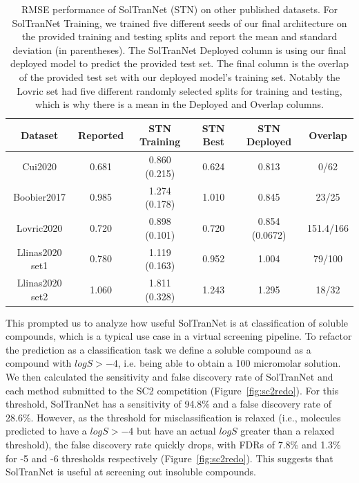 \documentclass[journal=jmcmar,manuscript=article]{achemso}
\begin{document}
\begin{table}
    \centering
    \begin{tabular}{|c|c|c|c|c|c|}
        \hline
        Dataset &  Reported & STN Training &  STN Best & STN Deployed & Overlap \\
        \hline
        Cui2020 & 0.681 & 0.860 (0.215) & 0.624 & 0.813 & 0/62 \\
        Boobier2017 & 0.985 & 1.274 (0.178) & 1.010 & 0.845 & 23/25 \\
        Lovric2020 & 0.720 & 0.898 (0.101) & 0.720 & 0.854 (0.0672) & 151.4/166 \\
        Llinas2020 set1 & 0.780 & 1.119 (0.163) & 0.952 & 1.004 & 79/100 \\
        Llinas2020 set2 & 1.060 & 1.811 (0.328) & 1.243 & 1.295 & 18/32 \\
        \hline
    \end{tabular}
    \caption{RMSE performance of SolTranNet (STN) on other published datasets. For SolTranNet Training, we trained five different seeds of our final architecture on the provided training and testing splits and report the mean and standard deviation (in parentheses). The SolTranNet Deployed column is using our final deployed model to predict the provided test set. The final column is the overlap of the provided test set with our deployed model's training set. Notably the Lovric set had five different randomly selected splits for training and testing, which is why there is a mean in the Deployed and Overlap columns.}
    \label{tab:othersetsrmse}
\end{table}

This prompted us to analyze how useful SolTranNet is at classification of soluble compounds, which is a typical use case in a virtual screening pipeline.
To refactor the prediction as a classification task we define a soluble compound as a compound with $logS > -4$, i.e. being able to obtain a 100 micromolar solution.
We then calculated the sensitivity and false discovery rate of SolTranNet and each method submitted to the SC2 competition (Figure~\ref{fig:sc2redo}).
For this threshold, SolTranNet has a sensitivity of 94.8\% and a false discovery rate of 28.6\%.
However, as the threshold for misclassification is relaxed (i.e., molecules predicted to have a $logS > -4$ but have an actual $logS$ greater than a relaxed threshold), the false discovery rate quickly drops, with FDRs of 7.8\% and 1.3\% for -5 and -6 thresholds respectively (Figure~\ref{fig:sc2redo}).
This suggests that SolTranNet is useful at screening out insoluble compounds.
\end{document}
